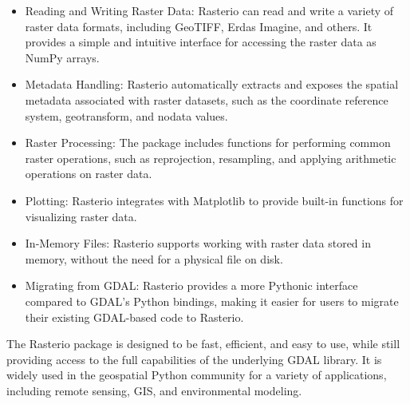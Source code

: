 \documentclass[a4paper,14pt] {report}
\begin{document}
	\begin{itemize}
		\item Reading and Writing Raster Data: Rasterio can read and write a variety of raster data formats, including GeoTIFF, Erdas Imagine, and others. It provides a simple and intuitive interface for accessing the raster data as NumPy arrays. 
		\item Metadata Handling: Rasterio automatically extracts and exposes the spatial metadata associated with raster datasets, such as the coordinate reference system, geotransform, and nodata values.
		\item Raster Processing: The package includes functions for performing common raster operations, such as reprojection, resampling, and applying arithmetic operations on raster data.
		\item Plotting: Rasterio integrates with Matplotlib to provide built-in functions for visualizing raster data.
		\item In-Memory Files: Rasterio supports working with raster data stored in memory, without the need for a physical file on disk.
		\item Migrating from GDAL: Rasterio provides a more Pythonic interface compared to GDAL's Python bindings, making it easier for users to migrate their existing GDAL-based code to Rasterio.
	\end{itemize}
	
	The Rasterio package is designed to be fast, efficient, and easy to use, while still providing access to the full capabilities of the underlying GDAL library. It is widely used in the geospatial Python community for a variety of applications, including remote sensing, GIS, and environmental modeling.
	
\end{document}
